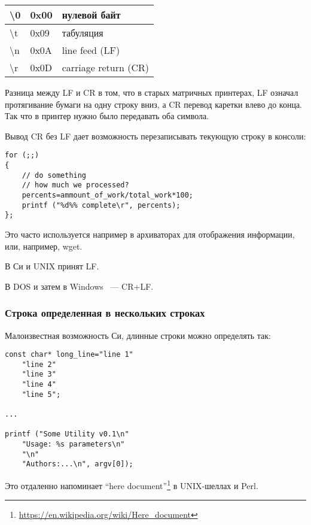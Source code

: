 \begin{center}
\begin{tabular}{ | l | l | l | }
\hline
\textbackslash{}0 & 0x00 & нулевой байт \\
\hline
\textbackslash{}t & 0x09 & табуляция \\
\hline
\textbackslash{}n & 0x0A & line feed (LF) \\
\hline
\textbackslash{}r & 0x0D & carriage return (CR) \\
\hline
\end{tabular}
\end{center}

Разница между LF и CR в том, что в старых матричных принтерах,
LF означал протягивание бумаги на одну строку вниз,
а CR перевод каретки влево до конца.
Так что в принтер нужно было передавать оба символа.

Вывод CR без LF дает возможность перезаписывать текующую строку в консоли:

\begin{lstlisting}
for (;;)
{
	// do something
	// how much we processed?
	percents=ammount_of_work/total_work*100;
	printf ("%d%% complete\r", percents);
};
\end{lstlisting}

Это часто используется например в архиваторах для отображения информации, или, например, wget.

В Си и UNIX принят LF.

В DOS и затем в Windows ~--- CR+LF.

\subsubsection{Строка определенная в нескольких строках}
\label{heredoc}
Малоизвестная возможность Си, длинные строки можно определять так:

\begin{lstlisting}
const char* long_line="line 1"
	"line 2"
	"line 3"
	"line 4"
	"line 5";

...

printf ("Some Utility v0.1\n"
	"Usage: %s parameters\n"
	"\n"
	"Authors:...\n", argv[0]);
\end{lstlisting}

Это отдаленно напоминает ``here document''\footnote{\url{https://en.wikipedia.org/wiki/Here_document}} в 
UNIX-шеллах и Perl.

